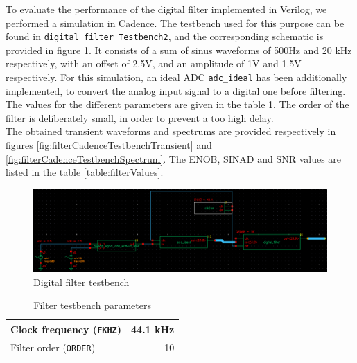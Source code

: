 To evaluate the performance of the digital filter implemented in Verilog, we performed a simulation in Cadence. The testbench used for this purpose can be found in \texttt{digital\_filter\_Testbench2}, and the corresponding schematic is provided in figure \ref{fig:filterTestbench}. It consists of a sum of sinus waveforms of 500Hz and 20 kHz respectively, with an offset of 2.5V, and an amplitude of 1V and 1.5V respectively. For this simulation, an ideal ADC \texttt{adc\_ideal} has been additionally implemented, to convert the analog input signal to a digital one before filtering. The values for the different parameters are given in the table \ref{table:filterTestbench}. The order of the filter is deliberately small, in order to prevent a too high delay.\\
The obtained transient waveforms and spectrums are provided respectively in figures \ref{fig:filterCadenceTestbenchTransient} and \ref{fig:filterCadenceTestbenchSpectrum}. The ENOB, SINAD and SNR values are listed in the table \ref{table:filterValues}.
 

\begin{figure}[!h]
	\centering 
	\includegraphics[scale=0.55]{images/Filter/testbench.png}
	\caption{Digital filter testbench}
	\label{fig:filterTestbench}
\end{figure} 

\begin{table}[!h]
	\centering
	\begin{tabular}{|l|r|}
		\hline
		Clock frequency (\texttt{FKHZ}) & 44.1 kHz \\
		\hline
		Filter order (\texttt{ORDER}) & 10 \\
		\hline
	\end{tabular}
	\caption{Filter testbench parameters}
	\label{table:filterTestbench}
\end{table}

